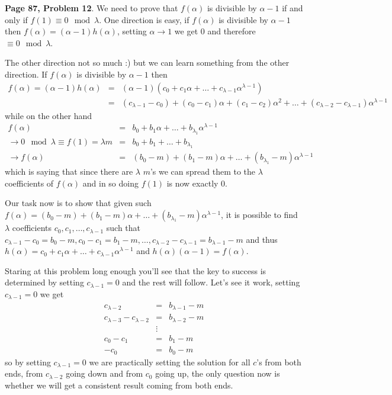 \documentclass[aps,preprint,preprintnumbers,nofootinbib,showpacs,prd]{revtex4-1}
\newcommand{\nbea}{\begin{eqnarray*}}
\newcommand{\neea}{\end{eqnarray*}}
\begin{document}
{\bf Page 87, Problem 12}. We need to prove that $f(\alpha)$ is divisible by $\alpha - 1$ if and only if $f(1) \equiv 0 \mod{\lambda}$. One direction is easy, if $f(\alpha)$ is divisible by $\alpha-1$ then $f(\alpha) = (\alpha - 1)h(\alpha)$, setting $\alpha \to 1$ we get $0$ and therefore $\equiv 0 \mod{\lambda}$.

The other direction not so much :) but we can learn something from the other direction. If $f(\alpha)$ is divisible by $\alpha - 1$ then 
%
\nbea
f(\alpha) = (\alpha - 1)h(\alpha) & = & (\alpha - 1)(c_0 + c_1 \alpha + \dots + c_{\lambda-1}\alpha^{\lambda-1}) \\
& = & (c_{\lambda - 1} - c_0) + (c_0 - c_1)\alpha + (c_1 - c_2)\alpha^2 + \dots + (c_{\lambda-2} - c_{\lambda-1})\alpha^{\lambda - 1}
\neea
%
while on the other hand 
%
\nbea
f(\alpha) & = & b_0 + b_1\alpha + \dots + b_{\lambda_1}\alpha^{\lambda-1} \\
\to 0 \mod{\lambda} \equiv f(1) = \lambda m & = & b_0 + b_1 + \dots + b_{\lambda_1} \\
\to f(\alpha) & = & (b_0 - m) + (b_1 - m)\alpha + \dots + (b_{\lambda_1} - m)\alpha^{\lambda-1}
\neea
%
which is saying that since there are $\lambda$ $m$'s we can spread them to the $\lambda$ coefficients of $f(\alpha)$ and in so doing $f(1)$ is now exactly 0.

Our task now is to show that given such $f(\alpha) = (b_0 - m) + (b_1 - m)\alpha + \dots + (b_{\lambda_1} - m)\alpha^{\lambda-1}$, it is possible to find $\lambda$ coefficients $c_0, c_1, \dots, c_{\lambda - 1}$ such that $c_{\lambda - 1} - c_0 = b_0 - m, c_0 - c_1 = b_1 - m, \dots, c_{\lambda-2} - c_{\lambda-1} = b_{\lambda - 1} - m$ and thus $h(\alpha) = c_0 + c_1 \alpha + \dots + c_{\lambda-1}\alpha^{\lambda-1}$ and $h(\alpha)(\alpha - 1) = f(\alpha)$.

Staring at this problem long enough you'll see that the key to success is determined by setting $c_{\lambda - 1} = 0$ and the rest will follow. Let's see it work, setting $c_{\lambda - 1} = 0$ we get
%
\nbea
c_{\lambda - 2} & = & b_{\lambda - 1} - m \\
c_{\lambda - 3} - c_{\lambda - 2} & = & b_{\lambda-2} - m \\
& \vdots & \\
c_0 - c_1 & = & b_1 - m \\
-c_0 & = & b_0 - m
\neea
%
so by setting $c_{\lambda - 1} = 0$ we are practically setting the solution for all $c$'s from both ends, from $c_{\lambda-2}$ going down and from $c_0$ going up, the only question now is whether we will get a consistent result coming from both ends.
\end{document}

